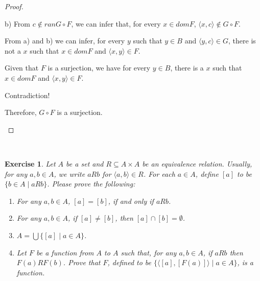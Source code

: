 \documentclass[12pt,a4paper,utf8]{article}
\theoremstyle{plain}
\newtheorem{exercise}{Exercise}
\begin{document}
\begin{proof}
\begin{enumerate}
        b) From $c \notin ranG\circ F$, we can infer that, for every $x \in domF$, $\langle x,c \rangle \notin G \circ F$. 
        
        From a) and b) we can infer, for every $y$ such that $y \in B$ and $\langle y,c \rangle \in G $, there is not a $x$ such that $x \in domF$ and $\langle x,y \rangle \in F$.
        
        Given that $F$ is a surjection, we have for every $y \in B$, there is a $x$ such that $x \in domF$ and $\langle x,y \rangle \in F$.
        
        Contradiction!
        
        Therefore, $G \circ F$ is a surjection.
    \end{enumerate}

\end{proof}

\ \\
\begin{exercise}
Let $A$ be a set and $R \subseteq A \times A$ be an equivalence relation.
Usually, for any $a , b \in A$, we write $aRb$ for $\langle a , b \rangle \in R$.
For each $a \in A$, define $[a]$ to be $\{ b \in A \mid aRb \}$.
Please prove the following:
%
\begin{enumerate}

\item For any $a , b \in A$, $[a] = [b]$, if and only if $aRb$.

\item For any $a , b \in A$, if $[a] \neq [b]$, then $[a] \cap [b] = \emptyset$.

\item $A = \bigcup \{ [a] \mid a \in A \}$.

\item Let $F$ be a function from $A$ to $A$ such that, for any $a , b \in A$, if $a R b$ then $F (a) R F (b)$. 
Prove that $\widehat{F}$, defined to be $\{ \langle [a] , [F(a)] \rangle \mid a \in A \}$, is a function.

\end{enumerate}
\end{exercise}
\end{document}
